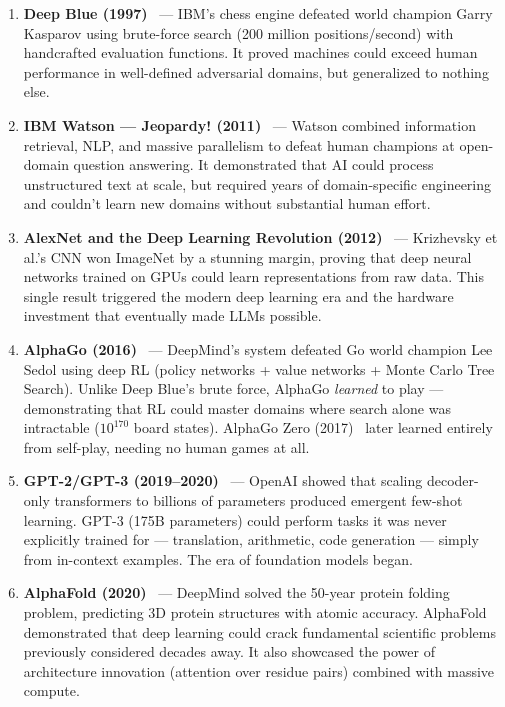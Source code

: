 \documentclass[11pt,a4paper,openany]{book}
\begin{document}
\begin{enumerate}
  \item \textbf{Deep Blue (1997)}~\cite{campbell2002deep} --- IBM’s chess engine defeated world champion Garry Kasparov using brute-force search (200 million positions/second) with handcrafted evaluation functions. It proved machines could exceed human performance in well-defined adversarial domains, but generalized to nothing else.
  \item \textbf{IBM Watson --- Jeopardy! (2011)}~\cite{ferrucci2010building} --- Watson combined information retrieval, NLP, and massive parallelism to defeat human champions at open-domain question answering. It demonstrated that AI could process unstructured text at scale, but required years of domain-specific engineering and couldn’t learn new domains without substantial human effort.
  \item \textbf{AlexNet and the Deep Learning Revolution (2012)}~\cite{krizhevsky2012imagenet} --- Krizhevsky et al.’s CNN won ImageNet by a stunning margin, proving that deep neural networks trained on GPUs could learn representations from raw data. This single result triggered the modern deep learning era and the hardware investment that eventually made LLMs possible.
  \item \textbf{AlphaGo (2016)}~\cite{silver2016mastering} --- DeepMind’s system defeated Go world champion Lee Sedol using deep RL (policy networks + value networks + Monte Carlo Tree Search). Unlike Deep Blue’s brute force, AlphaGo \emph{learned} to play --- demonstrating that RL could master domains where search alone was intractable ($10^{170}$ board states). AlphaGo Zero (2017)~\cite{silver2017mastering} later learned entirely from self-play, needing no human games at all.
  \item \textbf{GPT-2/GPT-3 (2019--2020)}~\cite{brown2020language} --- OpenAI showed that scaling decoder-only transformers to billions of parameters produced emergent few-shot learning. GPT-3 (175B parameters) could perform tasks it was never explicitly trained for --- translation, arithmetic, code generation --- simply from in-context examples. The era of foundation models began.
  \item \textbf{AlphaFold (2020)}~\cite{jumper2021alphafold} --- DeepMind solved the 50-year protein folding problem, predicting 3D protein structures with atomic accuracy. AlphaFold demonstrated that deep learning could crack fundamental scientific problems previously considered decades away. It also showcased the power of architecture innovation (attention over residue pairs) combined with massive compute.

\end{enumerate}
\end{document}

